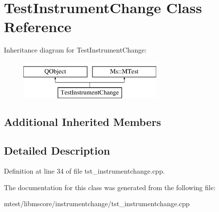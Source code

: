 \hypertarget{class_test_instrument_change}{}\section{Test\+Instrument\+Change Class Reference}
\label{class_test_instrument_change}
Inheritance diagram for Test\+Instrument\+Change\+:\begin{figure}[H]
\begin{center}
\leavevmode
\includegraphics[height=2.000000cm]{class_test_instrument_change}
\end{center}
\end{figure}
\subsection*{Additional Inherited Members}


\subsection{Detailed Description}


Definition at line 34 of file tst\+\_\+instrumentchange.\+cpp.



The documentation for this class was generated from the following file\+:\begin{DoxyCompactItemize}
\item 
mtest/libmscore/instrumentchange/tst\+\_\+instrumentchange.\+cpp\end{DoxyCompactItemize}
